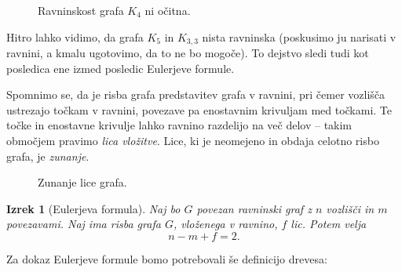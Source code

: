 \documentclass[12pt,a4paper]{amsart}
\theoremstyle{definition} %
\theoremstyle{plain} %
\newtheorem{izrek}[definicija]{Izrek}
\begin{document}
\begin{figure}[h]

    \caption{Ravninskost grafa $K_4$ ni očitna.}
\end{figure}

Hitro lahko vidimo, da grafa $K_5$ in $K_{3,3}$ nista ravninska (poskusimo ju narisati v ravnini, a kmalu ugotovimo, da to ne bo mogoče). To dejstvo sledi tudi kot posledica ene izmed posledic Eulerjeve formule.

Spomnimo se, da je risba grafa predstavitev grafa v ravnini, pri čemer vozlišča ustrezajo točkam v ravnini, povezave pa enostavnim krivuljam med točkami. Te točke in enostavne krivulje lahko ravnino razdelijo na več delov -- takim območjem pravimo \emph{lica vložitve}. Lice, ki je neomejeno in obdaja celotno risbo grafa, je \emph{zunanje}.

\begin{figure}[h]
    \caption{Zunanje lice grafa.}
\end{figure}

\begin{izrek}[Eulerjeva formula]
    \label{izr:euler-formula}
    Naj bo $G$ povezan ravninski graf z $n$ vozlišči in $m$ povezavami. Naj ima risba grafa $G$, vloženega v ravnino, $f$ lic. Potem velja
    \[ n - m + f = 2 .\]
\end{izrek}

Za dokaz Eulerjeve formule bomo potrebovali še definicijo drevesa:
\end{document}
